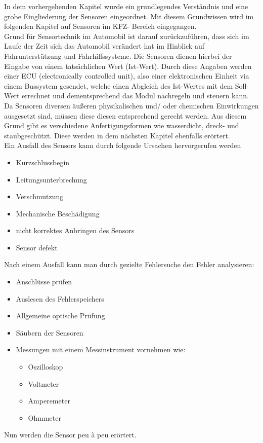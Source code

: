	\begin{flushleft}
		In dem vorhergehenden Kapitel wurde ein grundlegendes Verständnis und eine grobe Eingliederung der Sensoren eingeordnet. Mit diesem Grundwissen wird im folgenden Kapitel auf Sensoren im KFZ- Bereich eingegangen.\\
		Grund für Sensortechnik im Automobil ist darauf zurückzuführen, dass sich im Laufe der Zeit sich das Automobil verändert hat im Hinblick auf Fahrunterstützung und Fahrhilfssysteme.
		Die Sensoren dienen hierbei der Eingabe von einem tatsächlichen Wert (Ist-Wert). Durch diese Angaben werden einer ECU (electronically controlled unit), also einer elektronischen Einheit via einem Bussystem gesendet, welche einen Abgleich des Ist-Wertes mit dem Soll-Wert errechnet und dementsprechend das Modul nachregeln und steuern kann. \\ 
		Da Sensoren diversen äußeren physikalischen und/ oder chemischen Einwirkungen ausgesetzt sind, müssen diese diesen entsprechend gerecht werden. Aus diesem Grund gibt es verschiedene Anfertigungsformen wie wasserdicht, dreck- und staubgeschützt. Diese werden in dem nächsten Kapitel ebenfalls erörtert.\\  
		
		Ein Ausfall des Sensors kann durch folgende Ursachen hervorgerufen werden
		\begin{itemize}
			\item Kurzschlussbegin
			\item Leitungsunterbrechung
			\item Verschmutzung
			\item Mechanische Beschädigung
			\item nicht korrektes Anbringen des Sensors
			\item Sensor defekt
		\end{itemize}	
		
		Nach einem Ausfall kann man durch gezielte Fehlersuche den Fehler analysieren:
		\begin{itemize}
			\item Anschlüsse prüfen
			\item Auslesen des Fehlerspeichers
			\item Allgemeine optische Prüfung
			\item Säubern der Sensoren
			\item Messungen mit einem Messinstrument vornehmen wie:
			\begin{itemize}
				\item Oszilloskop 
				\item Voltmeter
				\item Amperemeter
				\item Ohmmeter	
			\end{itemize}
			
		\end{itemize}					
		
		Nun werden die Sensor peu à peu erörtert. 
		
		
		
	\end{flushleft}	
	
